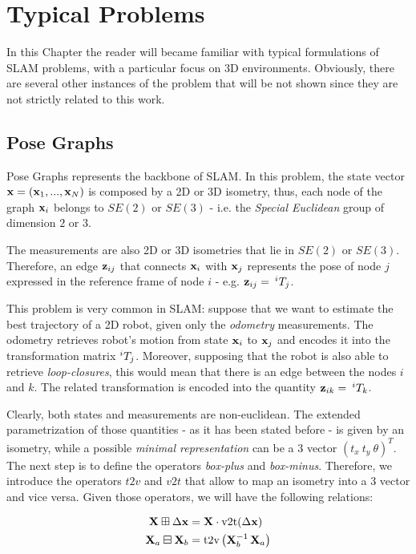 \chapter{Typical Problems}\label{ch:problems}
In this Chapter the reader will became familiar with typical formulations of SLAM problems, with a particular focus on 3D environments. Obviously, there are several other instances of the problem that will be not shown since they are not strictly related to this work.

\section{Pose Graphs}\label{sec:pose_graphs}
Pose Graphs represents the backbone of SLAM. In this problem, the state vector $\mathbf{x} = \left(\mathbf{x}_1, ..., \mathbf{x}_N\right)$ is composed by a 2D or 3D isometry, thus, each node of the graph $\mathbf{x}_i$ belongs to $SE(2)$ or $SE(3)$ - i.e. the \textit{Special Euclidean} group of dimension $2$ or $3$.

The measurements are also 2D or 3D isometries that lie in $SE(2)$ or $SE(3)$. Therefore, an edge $\mathbf{z}_{ij}$ that connects $\mathbf{x}_i$ with $\mathbf{x}_j$ represents the pose of node $j$ expressed in the reference frame of node $i$ - e.g. $\mathbf{z}_{ij} =\: ^{i}T_{j}$. 

This problem is very common in SLAM: suppose that we want to estimate the best trajectory of a 2D robot, given only the \textit{odometry} measurements. The odometry retrieves robot's motion from state $\mathbf{x}_i$ to $\mathbf{x}_j$ and encodes it into the transformation matrix $^{i}T_{j}$. Moreover, supposing that the robot is also able to retrieve \textit{loop-closures}, this would mean that there is an edge between the nodes $i$ and $k$. The related transformation is encoded into the quantity $\mathbf{z}_{ik} =\: ^{i}T_{k}$.

Clearly, both states and measurements are non-euclidean. The extended parametrization of those quantities - as it has been stated before - is given by an isometry, while a possible \textit{minimal representation} can be a $3$ vector $(t_{x}\: t_{y}\: \theta)^T$. The next step is to define the operators \textit{box-plus} and \textit{box-minus}. Therefore, we introduce the operators $t2v$ and $v2t$ that allow to map an isometry into a $3$ vector and vice versa. Given those operators, we will have the following relations:

\begin{align}
    \label{eq:boxplus_se2}
    \SState \boxplus \dx &= \SState \cdot \v2t(\dx)\\
    \label{eq:boxminus_se2}
    \SState_a \boxminus \SState_b &= \text{t2v}\left(\SState_b^{-1} \, \SState_a\right)
\end{align}

